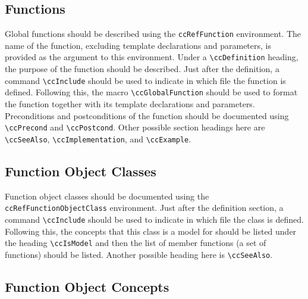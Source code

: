 \subsection{Functions}
\label{sec:ref_function}

Global functions should be described using the {\tt ccRefFunction} environment.
The name of the function, excluding template declarations and parameters,
is provided as the argument to this environment.  Under a \verb|\ccDefinition|
heading, the purpose of the function should be described. Just after the
definition, a command \verb|\ccInclude| should be used to indicate in which
file the function is defined.  Following this, the macro
\verb|\ccGlobalFunction| should be used to format the function together with its
template declarations and parameters.  Preconditions and postconditions 
of the function should be documented using \verb|\ccPrecond| and 
\verb|\ccPostcond|. Other possible section headings here are
\verb|\ccSeeAlso|, \verb|\ccImplementation|, and \verb|\ccExample|.

\subsection{Function Object Classes}
\label{sec:ref_function_object_class}

Function object classes should be documented using the
{\tt ccRefFunctionObjectClass} environment.  
Just after the definition section, a command \verb|\ccInclude| should be
used to indicate in which file the class is defined.  Following this,
the concepts that this class is a model for should be listed under
the heading \verb|\ccIsModel| and then the list of
member functions (a set of  functions) should be
listed. Another possible heading here is \verb|\ccSeeAlso|.

\subsection{Function Object Concepts}
\label{sec:ref_function_object_concept}

